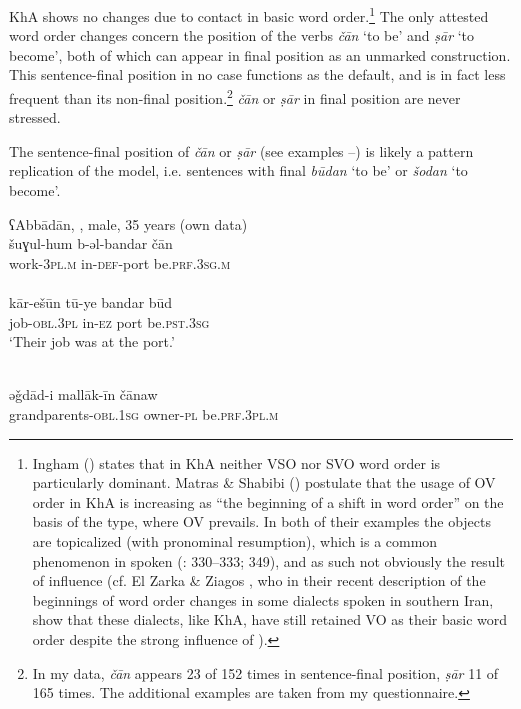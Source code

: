 \documentclass[output=paper,nonflat]{langsci/langscibook}
\begin{document}
KhA shows no changes due to contact in basic {word order}.\footnote{Ingham (\citeyear[715]{Ingham1991}) states that in KhA neither VSO nor SVO {word order} is particularly dominant. Matras \& Shabibi (\citeyear[147]{MatrasShabibi2007}) postulate that the usage of OV order in KhA is increasing as “the beginning of a shift in {word order}” on the basis of the  type, where OV prevails. In both of their examples the objects are topicalized (with pronominal resumption), which is a common phenomenon in spoken  (\citealt{Brustad2000}: 330–333; 349), and as such not obviously the result of  influence (cf. El Zarka \& Ziagos \citeyear{ElZarkaZiagos2019}, who in their recent description of the beginnings of {word order} changes in some  dialects spoken in southern Iran, show that these dialects, like KhA, have still retained VO as their basic {word order} despite the strong influence of ).}  The only attested {word order} changes concern the position of the verbs \textit{čān} ‘to be’ and \textit{ṣār} ‘to become’, both of which can appear in final position as an unmarked construction. This sentence-final position in no case functions as the default, and is in fact less frequent than its non-final position.\footnote{In my data, \textit{čān} appears 23 of 152 times in sentence-final position, \textit{ṣār} 11 of 165 times. The additional examples are taken from my questionnaire.} \textit{čān} or \textit{ṣār} in final position are never stressed.

The sentence-final position of \textit{čān} or \textit{ṣār} (see examples --) is likely a pattern {replication} of the  model, i.e. sentences with final \textit{būdan} ‘to be’ or \textit{šodan} ‘to become’.

\ea\label{port}
\ea
{ʕAbbādān, , male, 35 years (own data)}\\
\gll šuɣul-hum b-əl-bandar čān\\
     work-\textsc{3pl}.\textsc{m} in-\textsc{def}-port be.\textsc{prf.3sg.m}\\
 
\\
\gll kār-ešūn tū-ye bandar būd\\
     job-\textsc{obl}.3\textsc{pl} in-\textsc{ez} port be.\textsc{pst.3sg}\\
\glt ‘Their job was at the port.’
\z\z

\ea
{}\\
\gll əǧdād-i mallāk-īn čānaw\\
     grandparents-\textsc{obl.1sg} owner-\textsc{pl} be.\textsc{prf.3pl.m}\\
 
\end{document}
